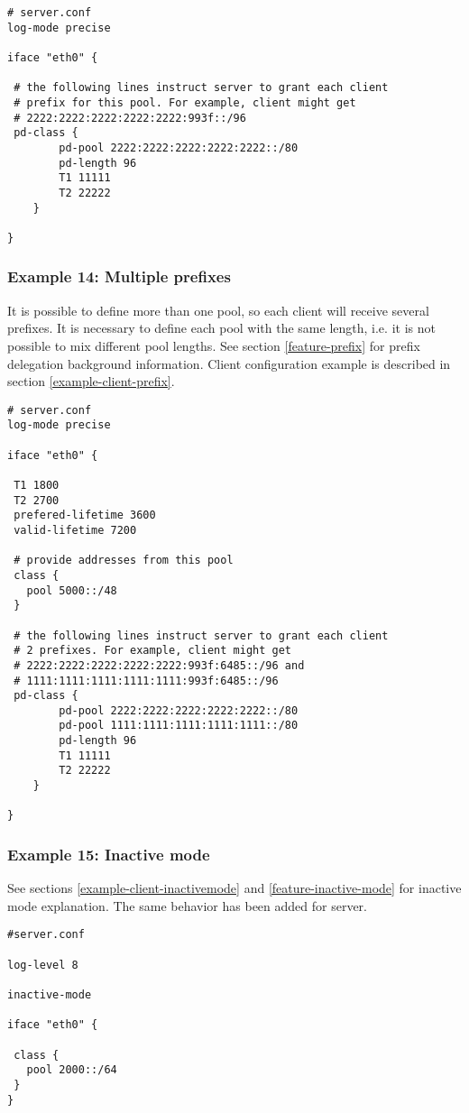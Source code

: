 \begin{lstlisting}
# server.conf
log-mode precise

iface "eth0" {

 # the following lines instruct server to grant each client
 # prefix for this pool. For example, client might get
 # 2222:2222:2222:2222:2222:993f::/96
 pd-class {
        pd-pool 2222:2222:2222:2222:2222::/80
        pd-length 96
        T1 11111
        T2 22222
    }

}
\end{lstlisting}

\subsubsection{Example 14: Multiple prefixes}
\label{example-server-prefixes}
It is possible to define more than one pool, so each client will
receive several prefixes. It is necessary to define each pool with the
same length, i.e. it is not possible to mix different pool lengths.
See section \ref{feature-prefix} for prefix delegation background
information. Client configuration example is described in section
\ref{example-client-prefix}.

\begin{lstlisting}
# server.conf
log-mode precise

iface "eth0" {

 T1 1800
 T2 2700
 prefered-lifetime 3600
 valid-lifetime 7200

 # provide addresses from this pool
 class {
   pool 5000::/48
 }

 # the following lines instruct server to grant each client
 # 2 prefixes. For example, client might get
 # 2222:2222:2222:2222:2222:993f:6485::/96 and
 # 1111:1111:1111:1111:1111:993f:6485::/96
 pd-class {
        pd-pool 2222:2222:2222:2222:2222::/80
        pd-pool 1111:1111:1111:1111:1111::/80
        pd-length 96
        T1 11111
        T2 22222
    }

}
\end{lstlisting}

\subsubsection{Example 15: Inactive mode}
\label{example-server-inactivemode}
See sections \ref{example-client-inactivemode} and
\ref{feature-inactive-mode} for inactive mode explanation.
The same behavior has been added for server.

\begin{lstlisting}
#server.conf

log-level 8

inactive-mode

iface "eth0" {

 class {
   pool 2000::/64
 }
}
\end{lstlisting}

